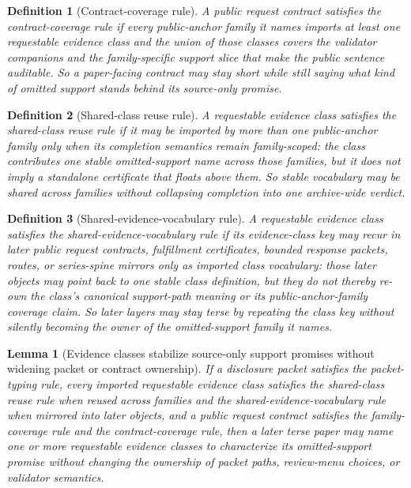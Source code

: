 \documentclass[11pt]{article}
\newtheorem{definition}{Definition}
\newtheorem{lemma}{Lemma}
\begin{document}
\begin{definition}[Contract-coverage rule]
A public request contract satisfies the \emph{contract-coverage rule} if every public-anchor family it names imports at least one requestable evidence class and the union of those classes covers the validator companions and the family-specific support slice that make the public sentence auditable.
So a paper-facing contract may stay short while still saying what kind of omitted support stands behind its source-only promise.
\end{definition}
\begin{definition}[Shared-class reuse rule]
A requestable evidence class satisfies the \emph{shared-class reuse rule} if it may be imported by more than one public-anchor family only when its completion semantics remain family-scoped: the class contributes one stable omitted-support name across those families, but it does not imply a standalone certificate that floats above them.
So stable vocabulary may be shared across families without collapsing completion into one archive-wide verdict.
\end{definition}


\begin{definition}[Shared-evidence-vocabulary rule]
A requestable evidence class satisfies the \emph{shared-evidence-vocabulary rule} if its evidence-class key may recur in later public request contracts, fulfillment certificates, bounded response packets, routes, or series-spine mirrors only as imported class vocabulary: those later objects may point back to one stable class definition, but they do not thereby re-own the class's canonical support-path meaning or its public-anchor-family coverage claim.
So later layers may stay terse by repeating the class key without silently becoming the owner of the omitted-support family it names.
\end{definition}

\begin{lemma}[Evidence classes stabilize source-only support promises without widening packet or contract ownership]
If a disclosure packet satisfies the packet-typing rule, every imported requestable evidence class satisfies the shared-class reuse rule when reused across families and the shared-evidence-vocabulary rule when mirrored into later objects, and a public request contract satisfies the family-coverage rule and the contract-coverage rule, then a later terse paper may name one or more requestable evidence classes to characterize its omitted-support promise without changing the ownership of packet paths, review-menu choices, or validator semantics.
\end{lemma}
\end{document}
